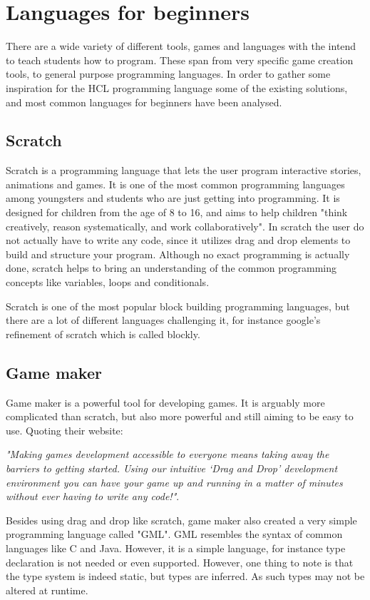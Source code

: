 \section{Languages for beginners}

There are a wide variety of different tools, games and languages with the intend to teach students how to program. 
These span from very specific game creation tools, to general purpose programming languages. 
In order to gather some inspiration for the HCL programming language some of the existing solutions, and most common languages for beginners have been analysed.

\subsection{Scratch}
\label{sec:scratch}
Scratch is a programming language that lets the user program interactive stories, animations and games. 
It is one of the most common programming languages among youngsters and students who are just getting into programming. 
It is designed for children from the age of 8 to 16, and aims to help children "think creatively, reason systematically, and work collaboratively". 
In scratch the user do not actually have to write any code, since it utilizes drag and drop elements to build and structure your program. 
Although no exact programming is actually done, scratch helps to bring an understanding of the common programming concepts like variables, loops and conditionals.\cite{ScratchWebsite}

Scratch is one of the most popular block building programming languages, but there are a lot of different languages challenging it, for instance google's refinement of scratch which is called blockly.\cite{Blockly}

\subsection{Game maker}
Game maker is a powerful tool for developing games. 
It is arguably more complicated than scratch, but also more powerful and still aiming to be easy to use. 
Quoting their website: 

\textit{"Making games development accessible to everyone means taking away the barriers to getting started. 
Using our intuitive ‘Drag and Drop’ development environment you can have your game up and running in a matter of minutes without ever having to write any code!"}.
\cite{GameMaker}
 
Besides using drag and drop like scratch, game maker also created a very simple programming language called "GML".
GML resembles the syntax of common languages like C and Java. 
However, it is a simple language, for instance type declaration is not needed or even supported. 
However, one thing to note is that the type system is indeed static, but types are inferred. 
As such types may not be altered at runtime.\cite{GML}

